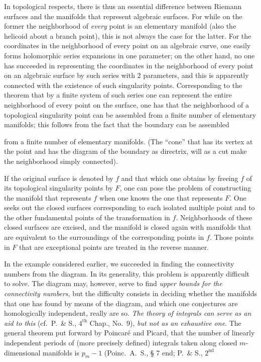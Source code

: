 \documentclass{article}
\begin{document}
In topological respects, there is thus an essential difference between Riemann surfaces and the manifolds that represent algebraic surfaces. For while on the former the neighborhood of \emph{every} point is an elementary manifold (also the helicoid about a branch point), this is not always the case for the latter. For the coordinates in the neighborhood of every point on an algebraic curve, one easily forms holomorphic series expansions in one parameter; on the other hand, no one has succeeded in representing the coordinates in the neighborhood of every point on an algebraic surface by such series with 2 parameters, and this is apparently connected with the existence of such singularity points. Corresponding to the theorem that by a finite system of such series one can represent the entire neighborhood of every point on the surface, one has that the neighborhood of a topological singularity point can be assembled from a finite number of elementary manifolds; this follows from the fact that the boundary can be assembled

from a finite number of elementary manifolds. (The ``cone'' that has its vertex at the point and has the diagram of the boundary as directrix, will as a cut make the neighborhood simply connected).

If the original surface is denoted by $f$ and that which one obtains by freeing $f$ of its topological singularity points by $F$, one can pose the problem of constructing the manifold that represents $f$ when one knows the one that represents $F$. One seeks out the closed surfaces corresponding to each isolated multiple point and to the other fundamental points of the transformation in $f$. Neighborhoods of these closed surfaces are excised, and the manifold is closed again with manifolds that are equivalent to the surroundings of the corresponding points in $f$. Those points in $F$ that are exceptional points are treated in the reverse manner.

In the example considered earlier, we succeeded in finding the connectivity numbers from the diagram. In its generality, this problem is apparently difficult to solve. The diagram may, however, serve to find \emph{upper bounds for the connectivity numbers}, but the difficulty consists in deciding whether the manifolds that one has found by means of the diagram, and which one conjectures are homologically independent, really are so. \emph{The theory of integrals can serve as an aid to this} (cf.\ P.\ \& S., $4^{\text{th}}$ Chap., No.\ 9), \emph{but not as an exhaustive one}. The general theorem put forward by Poincaré and Picard, that the number of linearly independent periods of (more precisely defined) integrals taken along closed $m$-dimensional manifolds is $p_m - 1$ (Poinc.\ A.\ S., § 7 end; P.\ \& S., $2^{\text{nd}}$
\end{document}
